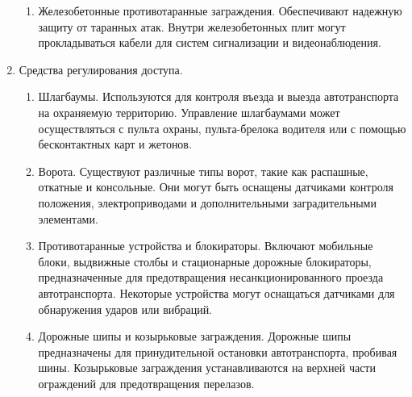 \begin{enumerate}
\begin{enumerate}
        \item Железобетонные противотаранные заграждения. Обеспечивают надежную защиту от таранных атак. Внутри железобетонных плит могут прокладываться кабели для систем сигнализации и видеонаблюдения.
    \end{enumerate}
    \item Средства регулирования доступа.
    \begin{enumerate}
        \item Шлагбаумы. Используются для контроля въезда и выезда автотранспорта на охраняемую территорию. Управление шлагбаумами может осуществляться с пульта охраны, пульта-брелока водителя или с помощью бесконтактных карт и жетонов.
        \item Ворота. Существуют различные типы ворот, такие как распашные, откатные и консольные. Они могут быть оснащены датчиками контроля положения, электроприводами и дополнительными заградительными элементами.
        \item Противотаранные устройства и блокираторы. Включают мобильные блоки, выдвижные столбы и стационарные дорожные блокираторы, предназначенные для предотвращения несанкционированного проезда автотранспорта. Некоторые устройства могут оснащаться датчиками для обнаружения ударов или вибраций.
        \item Дорожные шипы и козырьковые заграждения. Дорожные шипы предназначены для принудительной остановки автотранспорта, пробивая шины. Козырьковые заграждения устанавливаются на верхней части ограждений для предотвращения перелазов.
    \end{enumerate}
\end{enumerate}
